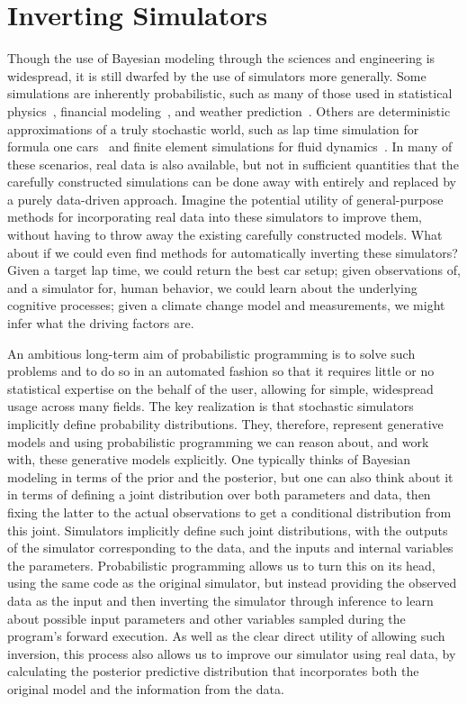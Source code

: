 
\section{Inverting Simulators}
\label{sec:probprog:inv}

Though the use of Bayesian modeling through the sciences and engineering is widespread,
it is still dwarfed by the use of simulators more generally.  Some simulations are inherently
probabilistic, such as many of those used in statistical physics~\citep{landau2014guide},
 financial modeling~\citep{jackel2002monte}, and weather prediction~\citep{evensen1994sequential}.  
 Others are deterministic approximations
of a truly stochastic world, such as lap time simulation for formula one cars~\citep{perantoni2014optimal}
and finite element simulations for fluid dynamics~\citep{versteeg2007introduction}.
In many of these scenarios, real data is also available, but not in sufficient quantities that the carefully
constructed simulations can be done away with entirely and replaced by a purely data-driven
approach.  
Imagine the potential utility of general-purpose methods for incorporating real data
into these simulators to improve them, without having to throw away the existing carefully constructed models.  
What about if we could even find methods for automatically
inverting these simulators?  Given a target lap time, we could return the best car setup; given observations
of, and a simulator for, human behavior, we could learn about the underlying cognitive processes; given
a climate change model and measurements, we might infer what the driving factors are.  

An ambitious long-term aim of probabilistic programming is to solve such problems and to do so in an automated fashion
so that it requires little or no statistical expertise on the behalf of the user, allowing for simple, widespread usage
across many fields.  The key realization is that stochastic simulators implicitly define probability distributions.
They, therefore, represent generative models and using probabilistic programming we can reason about, and
work with, these generative models explicitly.  One typically thinks of Bayesian modeling in terms of the
prior and the posterior, but one can also think about it in terms of defining a joint distribution over
both parameters and data, then fixing the latter to the actual observations to get a conditional distribution from
this joint.  Simulators implicitly define such joint distributions, with the outputs of the simulator corresponding
to the data, and the inputs and internal variables the parameters.  Probabilistic programming allows us to turn this on its head,
using the same code as the original simulator, but instead providing the observed data as the input and
then inverting the simulator through inference to learn about possible input parameters and other 
variables sampled during the program's forward execution.  
As well as the clear direct utility of allowing such inversion, this process also allows us to improve
our simulator using real data, by calculating the posterior predictive distribution that incorporates both
the original model and the information from the data.

